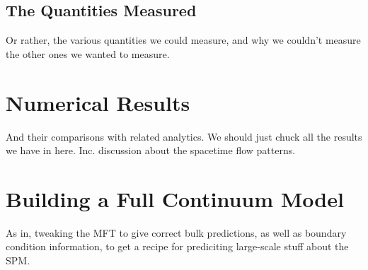 \subsection{The Quantities Measured}
Or rather, the various quantities we could measure, and why we couldn't measure the other ones we wanted to measure.

\section{Numerical Results}
And their comparisons with related analytics. We should just chuck all the results we have in here. Inc. discussion about the spacetime flow patterns.

\section{Building a Full Continuum Model}
As in, tweaking the MFT to give correct bulk predictions, as well as boundary condition information, to get a recipe for prediciting large-scale stuff about the SPM.